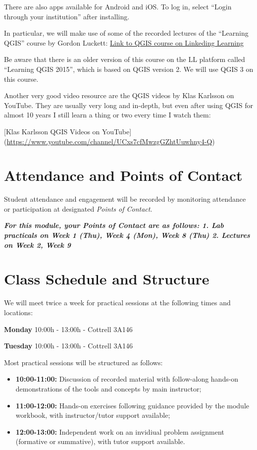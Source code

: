 \documentclass[
]{book}
\providecommand{\tightlist}{%
  \setlength{\itemsep}{0pt}\setlength{\parskip}{0pt}}
\begin{document}
There are also apps available for Android and iOS. To log in, select ``Login through your institution'' after installing.

In particular, we will make use of some of the recorded lectures of the ``Learning QGIS'' course by Gordon Luckett:
\href{https://www.linkedin.com/learning/learning-qgis-2/}{Link to QGIS course on Linkeding Learning}

Be aware that there is an older version of this course on the LL platform called ``Learning QGIS 2015'', which is based on QGIS version 2. We will use QGIS 3 on this course.

Another very good video resource are the QGIS videos by Klas Karlsson on YouTube. They are usually very long and in-depth, but even after using QGIS for almost 10 years I still learn a thing or two every time I watch them:

{[}Klas Karlsson QGIS Videos on YouTube{]} (\url{https://www.youtube.com/channel/UCxs7cfMwzgGZhtUuwhny4-Q})

\hypertarget{attendance-and-points-of-contact}{%
\section{Attendance and Points of Contact}\label{attendance-and-points-of-contact}}

Student attendance and engagement will be recorded by monitoring attendance or participation at designated \emph{Points of Contact}.

\textbf{\emph{For this module, your Points of Contact are as follows:
1. Lab practicals on Week 1 (Thu), Week 4 (Mon), Week 8 (Thu) 2. Lectures on
Week 2, Week 9 }}

\hypertarget{class-schedule-and-structure}{%
\section{Class Schedule and Structure}\label{class-schedule-and-structure}}

We will meet twice a week for practical sessions at the following times and locations:

\textbf{Monday} 10:00h - 13:00h - Cottrell 3A146

\textbf{Tuesday} 10:00h - 13:00h - Cottrell 3A146

Most practical sessions will be structured as follows:

\begin{itemize}
\tightlist
\item
  \textbf{10:00-11:00:} Discussion of recorded material with follow-along hands-on demonstrations of the tools and concepts by main instructor;
\item
  \textbf{11:00-12:00:} Hands-on exercises following guidance provided by the module workbook, with instructor/tutor support available;
\item
  \textbf{12:00-13:00:} Independent work on an invidiual problem assignment (formative or summative), with tutor support available.
\end{itemize}
\end{document}
